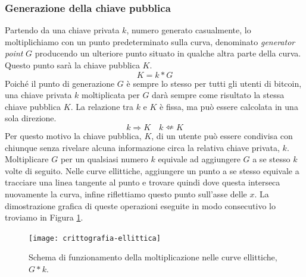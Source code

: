 \subsubsection{Generazione della chiave pubblica}
Partendo da una chiave privata $k$, numero generato casualmente, lo moltiplichiamo con un punto predeterminato sulla curva, denominato \textit{generator point} $G$ producendo un ulteriore punto situato in qualche altra parte della curva. Questo punto sarà la chiave pubblica $K$. 
\[ K=k*G \]
Poiché il punto di generazione $G$ è sempre lo stesso per tutti gli utenti di bitcoin, una chiave privata $k$ moltiplicata per $G$ darà sempre come risultato la stessa chiave pubblica $K$. La relazione tra $k$ e $K$ è fissa, ma può essere calcolata in una sola direzione.
\[ k \Rightarrow K \quad k \nLeftarrow K\]
Per questo motivo la chiave pubblica, $K$, di un utente può essere condivisa con chiunque senza rivelare alcuna informazione circa la relativa chiave privata, $k$.
Moltiplicare $G$ per un qualsiasi numero $k$ equivale ad aggiungere $G$ a se stesso $k$ volte di seguito. Nelle curve ellittiche, aggiungere un punto a se stesso equivale a tracciare una linea tangente al punto e trovare quindi dove questa interseca nuovamente la curva, infine riflettiamo questo punto sull'asse delle $x$. La dimostrazione grafica di queste operazioni eseguite in modo consecutivo lo troviamo in Figura \ref{fig:crittografia-ellittica}.
\begin{figure}
	\centering 
	\texttt{[image: crittografia-ellittica]} 
	\caption[Crittografia Ellittica]{Schema di funzionamento della moltiplicazione nelle curve ellittiche, $G*k$.}
	\label{fig:crittografia-ellittica} 
\end{figure}

